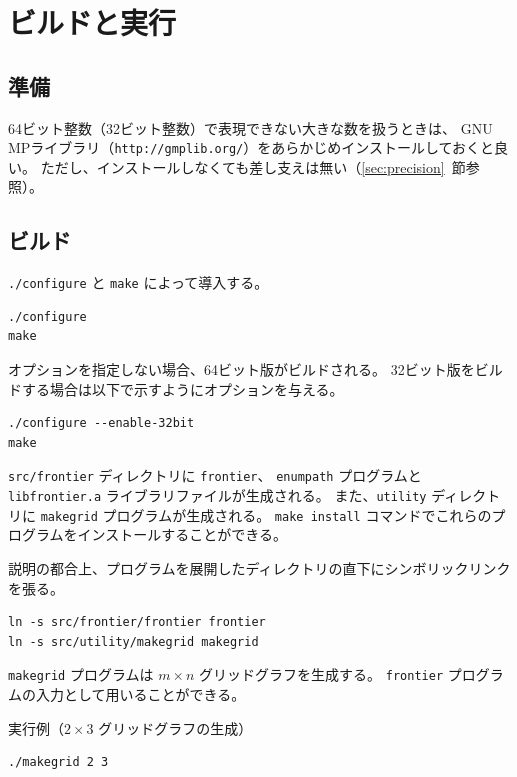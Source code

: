 \documentclass{jsarticle}
\begin{document}
\section{ビルドと実行}

\subsection{準備}

64ビット整数（32ビット整数）で表現できない大きな数を扱うときは、
GNU MPライブラリ（\texttt{http://gmplib.org/}）をあらかじめインストールしておくと良い。
ただし、インストールしなくても差し支えは無い（\ref{sec:precision}~節参照）。

\subsection{ビルド}

\texttt{./configure} と \texttt{make} によって導入する。

\begin{verbatim}
./configure
make
\end{verbatim}

オプションを指定しない場合、64ビット版がビルドされる。
32ビット版をビルドする場合は以下で示すようにオプションを与える。

\begin{verbatim}
./configure --enable-32bit
make
\end{verbatim}

\texttt{src/frontier} ディレクトリに \texttt{frontier}、 \texttt{enumpath} プログラムと
\texttt{libfrontier.a} ライブラリファイルが生成される。
また、\texttt{utility} ディレクトリに \texttt{makegrid} プログラムが生成される。
\texttt{make install} コマンドでこれらのプログラムをインストールすることができる。

説明の都合上、プログラムを展開したディレクトリの直下にシンボリックリンクを張る。

\begin{verbatim}
ln -s src/frontier/frontier frontier
ln -s src/utility/makegrid makegrid
\end{verbatim}

\texttt{makegrid} プログラムは $m \times n$ グリッドグラフを生成する。
\texttt{frontier} プログラムの入力として用いることができる。

実行例（$2 \times 3$ グリッドグラフの生成）

\begin{verbatim}
./makegrid 2 3
\end{verbatim}
\end{document}
